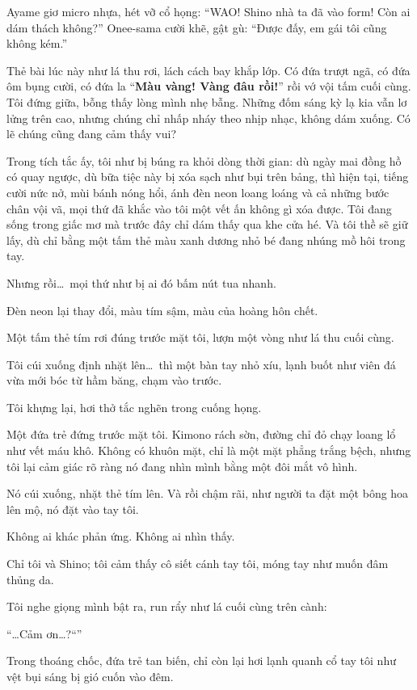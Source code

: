 \documentclass[../main.tex]{subfiles}
\begin{document}
Ayame giơ micro nhựa, hét vỡ cổ họng: ``WAO! Shino nhà ta đã vào form! Còn ai dám thách không?'' Onee-sama cười khẽ, gật gù: ``Được đấy, em gái tôi cũng không kém.''

Thẻ bài lúc này như lá thu rơi, lách cách bay khắp lớp. Có đứa trượt ngã, có đứa ôm bụng cười, có đứa la ``\textbf{Màu vàng! Vàng đâu rồi!}'' rồi vớ vội tấm cuối cùng. Tôi đứng giữa, bỗng thấy lòng mình nhẹ bẫng. Những đốm sáng kỳ lạ kia vẫn lơ lửng trên cao, nhưng chúng chỉ nhấp nháy theo nhịp nhạc, không dám xuống. Có lẽ chúng cũng đang cảm thấy vui?

Trong tích tắc ấy, tôi như bị búng ra khỏi dòng thời gian: dù ngày mai đồng hồ có quay ngược, dù bữa tiệc này bị xóa sạch như bụi trên bảng, thì hiện tại, tiếng cười nức nở, mùi bánh nóng hổi, ánh đèn neon loang loáng và cả những bước chân vội vã, mọi thứ đã khắc vào tôi một vết ấn không gì xóa được. Tôi đang sống trong giấc mơ mà trước đây chỉ dám thấy qua khe cửa hé. Và tôi thề sẽ giữ lấy, dù chỉ bằng một tấm thẻ màu xanh dương nhỏ bé đang nhúng mồ hôi trong tay.

Nhưng rồi\dots\ mọi thứ như bị ai đó bấm nút tua nhanh.

Đèn neon lại thay đổi, màu tím sậm, màu của hoàng hôn chết.

Một tấm thẻ tím rơi đúng trước mặt tôi, lượn một vòng như lá thu cuối cùng.

Tôi cúi xuống định nhặt lên\dots\ thì một bàn tay nhỏ xíu, lạnh buốt như viên đá vừa mới bóc từ hầm băng, chạm vào trước.

Tôi khựng lại, hơi thở tắc nghẽn trong cuống họng.

Một đứa trẻ đứng trước mặt tôi. Kimono rách sờn, đường chỉ đỏ chạy loang lổ như vết máu khô. Không có khuôn mặt, chỉ là một mặt phẳng trắng bệch, nhưng tôi lại cảm giác rõ ràng nó đang nhìn mình bằng một đôi mắt vô hình.

Nó cúi xuống, nhặt thẻ tím lên. Và rồi chậm rãi, như người ta đặt một bông hoa lên mộ, nó đặt vào tay tôi.

Không ai khác phản ứng. Không ai nhìn thấy.

Chỉ tôi và Shino; tôi cảm thấy cô siết cánh tay tôi, móng tay như muốn đâm thủng da.

Tôi nghe giọng mình bật ra, run rẩy như lá cuối cùng trên cành:

``\dots Cảm ơn\dots?``''

Trong thoáng chốc, đứa trẻ tan biến, chỉ còn lại hơi lạnh quanh cổ tay tôi như vệt bụi sáng bị gió cuốn vào đêm.
\end{document}
